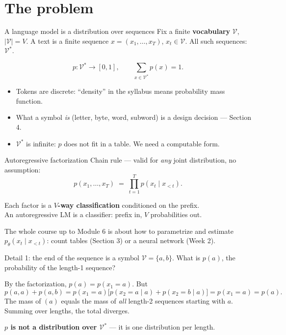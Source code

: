 \documentclass[11pt,aspectratio=169]{beamer}
\newcommand{\V}{\mathcal{V}}
\newcommand{\ptheta}{p_{\theta}}
\newcommand{\dest}[1]{\textcolor{structure}{\textbf{#1}}}
\begin{document}
\section{The problem}

\begin{frame}{A language model is a distribution over sequences}
  Fix a finite \dest{vocabulary} $\V$, $|\V| = V$. A text is a finite sequence
  $x = (x_1,\dots,x_T)$, $x_t\in\V$. All such sequences: $\V^{*}$.

  \vspace{0.8em}
  \[
    p : \V^{*}\to[0,1], \qquad \sum_{x\in\V^{*}} p(x) = 1 .
  \]

  \vspace{0.8em}
  \begin{itemize}
    \item Tokens are discrete: ``density'' in the syllabus means probability mass function.
    \item What a symbol \emph{is} (letter, byte, word, subword) is a design decision ---
          Section 4.
    \item $\V^{*}$ is infinite: $p$ does not fit in a table. We need a computable form.
  \end{itemize}
\end{frame}

\begin{frame}{Autoregressive factorization}
  Chain rule --- valid for \emph{any} joint distribution, no assumption:
  \[
    p(x_1,\dots,x_T) \;=\; \prod_{t=1}^{T} p(x_t\mid x_{<t}).
  \]

  \vspace{0.6em}
  \begin{block}{}
    Each factor is a \textbf{$V$-way classification} conditioned on the prefix.\\
    An autoregressive LM is a classifier: prefix in, $V$ probabilities out.
  \end{block}

  \vspace{0.8em}
  The whole course up to Module 6 is about how to parametrize and estimate
  $\ptheta(x_t\mid x_{<t})$: count tables (Section 3) or a neural network (Week 2).
\end{frame}

\begin{frame}{Detail 1: the end of the sequence is a symbol}
  $\V = \{a,b\}$. What is $p(a)$, the probability of the length-1 sequence?

  \vspace{0.4em}
  By the factorization, $p(a) = p(x_1 = a)$. But
  \[
    p(a,a) + p(a,b) = p(x_1=a)\big[p(x_2=a\mid a) + p(x_2=b\mid a)\big] = p(x_1 = a) = p(a).
  \]
  The mass of $(a)$ equals the mass of \emph{all} length-2 sequences starting with $a$.
  Summing over lengths, the total diverges.

  \vspace{0.6em}
  \dest{$p$ is not a distribution over $\V^{*}$} --- it is one distribution per length.
\end{frame}
\end{document}
